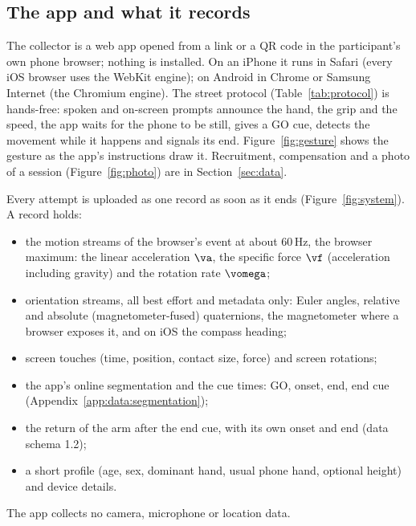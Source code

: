 \subsection{The app and what it records}\label{app:data:app}

The collector is a web app opened from a link or a QR code in the participant's own phone browser; nothing is
installed. On an iPhone it runs in Safari (every iOS browser uses the WebKit engine); on Android in Chrome or
Samsung Internet (the Chromium engine). The street protocol (Table~\ref{tab:protocol}) is hands-free: spoken
and on-screen prompts announce the hand, the grip and the speed, the app waits for the phone to be still, gives
a GO cue, detects the movement while it happens and signals its end. Figure~\ref{fig:gesture} shows the gesture
as the app's instructions draw it. Recruitment, compensation and a photo of a session (Figure~\ref{fig:photo}) are
in Section~\ref{sec:data}.

Every attempt is uploaded as one record as soon as it ends (Figure~\ref{fig:system}). A record holds:
\begin{itemize}[nosep]
  \item the motion streams of the browser's  event at about 60\,Hz, the browser maximum:
    the linear acceleration $\va$, the specific force $\vf$ (acceleration including gravity) and the rotation
    rate $\vomega$;
  \item orientation streams, all best effort and metadata only: Euler angles, relative and absolute
    (magnetometer-fused) quaternions, the magnetometer where a browser exposes it, and on iOS the compass
    heading;
  \item screen touches (time, position, contact size, force) and screen rotations;
  \item the app's online segmentation and the cue times: GO, onset, end, end cue
    (Appendix~\ref{app:data:segmentation});
  \item the return of the arm after the end cue, with its own onset and end (data schema 1.2);
  \item a short profile (age, sex, dominant hand, usual phone hand, optional height) and device details.
\end{itemize}
The app collects no camera, microphone or location data.

